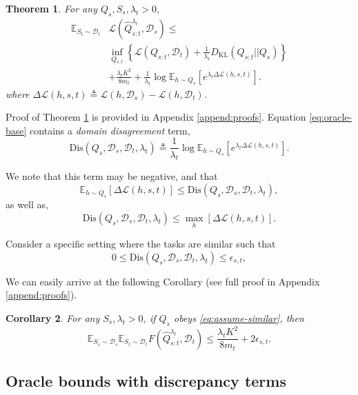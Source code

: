 \documentclass{article}
\theoremstyle{plain}
\newtheorem{theorem}{Theorem}[section]
\newtheorem{corollary}[theorem]{Corollary}
\theoremstyle{definition}
\theoremstyle{remark}
\begin{document}
\begin{theorem} \label{thm:oracle-base}
For any $Q_s, S_s, \lambda_t>0$, 
\begin{align} \label{eq:oracle-base}
\mathbb{E}_{S_t\sim \mathcal{D}_t}&\mathcal{L}( \hat{Q}^{\lambda_t}_{s:t},\mathcal{D}_s)\leq \nonumber \\ 
&\inf_{Q_{s:t}}\left \{ \mathcal{L}(Q_{s:t},\mathcal{D}_t) + \frac{1}{\lambda_t}D_{\mathrm{KL}}(Q_{s:t}||Q_{s}) \right \} \\
&+\frac{\lambda_t K^2}{8m_t}+\frac{1}{\lambda_t}\log\mathbb{E}_{h\sim Q_s}\left [e^{\lambda_t\Delta \mathcal{L}(h,s,t)} \right ].\nonumber 
\end{align}
%
where $\Delta \mathcal{L}(h,s,t)\triangleq \mathcal{L}(h,\mathcal{D}_s)-\mathcal{L}(h,\mathcal{D}_t)$.
\end{theorem}
%
Proof of Theorem \ref{thm:oracle-base} is provided in Appendix \ref{append:proofs}. Equation \eqref{eq:oracle-base} contains a \emph{domain disagreement} term, $$\mathrm{Dis}(Q_s,\mathcal{D}_s, \mathcal{D}_t, \lambda_t )\triangleq\frac{1}{\lambda_t}\log\mathbb{E}_{h\sim Q_s}\left [e^{\lambda_t\Delta \mathcal{L}(h,s,t)} \right ].$$

We note that this term may be negative, and that 
$$\mathbb{E}_{h\sim Q_s}\left [\Delta \mathcal{L}(h,s,t) \right ] \leq \mathrm{Dis}(Q_s,\mathcal{D}_s, \mathcal{D}_t, \lambda_t ),$$
as well as,
$$\mathrm{Dis}(Q_s,\mathcal{D}_s, \mathcal{D}_t, \lambda_t )\leq \max_{h}\left [\Delta \mathcal{L}(h,s,t) \right ].$$

Consider a specific setting where the tasks are similar such that 
\begin{equation} \label{eq:assume-similar}
    0\leq \mathrm{Dis}(Q_s,\mathcal{D}_s, \mathcal{D}_t, \lambda_t ) \leq \epsilon_{s,t},
\end{equation}

We can easily arrive at the following Corollary (see full proof in Appendix \ref{append:proofs}).
\begin{corollary}
For any $S_s, \lambda_t>0$, 
    if $Q_s$ obeys \eqref{eq:assume-similar},
    then
    \begin{equation}
\mathbb{E}_{S_s\sim \mathcal{D}_s}\mathbb{E}_{S_t\sim \mathcal{D}_t}F(\hat{Q}^{\lambda_t}_{s:t},\mathcal{D}_t)\leq \frac{\lambda_t K^2}{8m_t} + 2\epsilon_{s,t} .
    \end{equation}
\end{corollary}

\subsection{Oracle bounds with discrepancy terms}
\end{document}
